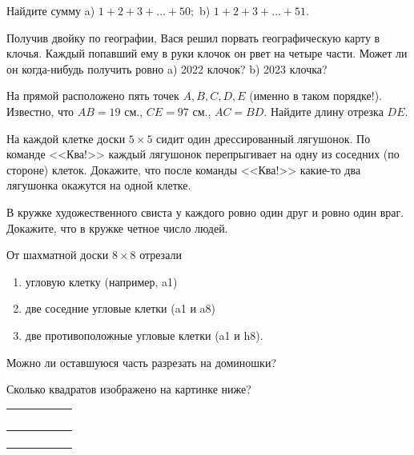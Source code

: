 \documentclass{article}
\begin{document}
\begin{enumerate_boxed}
        \item Найдите сумму a) $1+2+3+\dots+50;$ b) $1+2+3+\dots+51.$


        \item Получив двойку по географии, Вася решил порвать географическую карту в клочья.
        Каждый попавший ему в руки клочок он рвет на четыре части.
        Может ли он когда-нибудь получить ровно
        a) 2022 клочок?
        b) 2023 клочка?

        \item На прямой расположено пять точек $A, B, C, D, E$ (именно в таком порядке!).
        Известно, что $AB = 19$ см., $CE = 97$ см., $AC = BD$.
        Найдите длину отрезка $DE$.

        \item На каждой клетке доски $5 \times 5$ сидит один дрессированный лягушонок.
        По команде <<Ква!>> каждый лягушонок перепрыгивает на одну из соседних (по стороне) клеток.
        Докажите, что после команды <<Ква!>> какие-то два лягушонка окажутся на одной клетке.

        \item В кружке художественного свиста у каждого ровно один друг и ровно один враг.
        Докажите, что в кружке четное число людей.

        \item От шахматной доски $8 \times 8$ отрезали
        \begin{enumerate}
            \item угловую клетку (например, a1)

            \item две соседние угловые клетки (a1 и a8)

            \item две противоположные угловые клетки (a1 и h8).
        \end{enumerate}

        Можно ли оставшуюся часть разрезать на доминошки?

        \item Сколько квадратов изображено на картинке ниже?

        \begin{table}[h]
            \centering
            \begin{tabular}{|c|c|c|c|c|}
                \hline
                \, & \, & \, & \, & \, \\\hline
                &    &    &    &    \\\hline
                &    &    &    &    \\\hline
                &    &    &    &    \\\hline
                &    &    &    &    \\\hline
            \end{tabular}\label{tab:table3}
        \end{table}


\end{enumerate_boxed}
\end{document}
